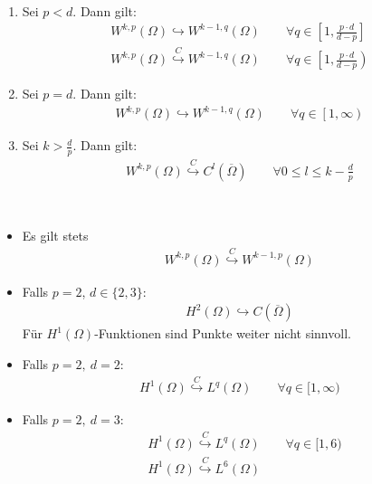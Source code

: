 \begin{satz}[Einbettung]\label{satz1.10}\
	\begin{enumerate}
		\item Sei $p<d$. Dann gilt:
		\begin{align*}
			W^{k,p}(\Omega)\hookrightarrow W^{k-1,q}(\Omega)\qquad\forall q\in\left[1,\frac{p\cdot d}{d-p}\right]\\
			W^{k,p}(\Omega)\stackrel{C}{\hookrightarrow} W^{k-1,q}(\Omega)\qquad\forall q\in\left[1,\frac{p\cdot d}{d-p}\right)
		\end{align*}
		\item Sei $p=d$. Dann gilt:
		\begin{align*}
			W^{k,p}(\Omega)\hookrightarrow W^{k-1,q}(\Omega)\qquad\forall q\in\left[1,\infty\right)
		\end{align*}
		\item Sei $k>\frac{d}{p}$. Dann gilt:
		\begin{align*}
			W^{k,p}(\Omega)\stackrel{C}{\hookrightarrow} C^l(\overline{\Omega})\qquad\forall 0\leq l\leq k-\frac{d}{p}
		\end{align*}
	\end{enumerate}
\end{satz}

\begin{bemerkung}\
	\begin{itemize}
		\item Es gilt stets
		\begin{align*}
			W^{k,p}(\Omega)\stackrel{C}{\hookrightarrow} W^{k-1,p}(\Omega)
		\end{align*}
		\item Falls $p=2$, $d\in\lbrace2,3\rbrace$:
		\begin{align*}
			H^2(\Omega)\hookrightarrow C(\overline{\Omega})
		\end{align*}
		Für $H^1(\Omega)$-Funktionen sind Punkte weiter nicht sinnvoll.
		\item Falls $p=2,~d=2$:
		\begin{align*}
			H^1(\Omega)\stackrel{C}{\hookrightarrow} L^q(\Omega)\qquad\forall q\in[1,\infty)
		\end{align*}
		\item Falls $p=2,~d=3$:
		\begin{align*}
			&H^1(\Omega)\stackrel{C}{\hookrightarrow} L^q(\Omega)\qquad\forall q\in[1,6)\\
			&H^1(\Omega)\stackrel{C}{\hookrightarrow} L^6(\Omega)
		\end{align*}
	\end{itemize}
\end{bemerkung}

